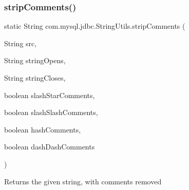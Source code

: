\subsubsection{\texorpdfstring{strip\+Comments()}{stripComments()}}
{\footnotesize\ttfamily static String com.\+mysql.\+jdbc.\+String\+Utils.\+strip\+Comments (\begin{DoxyParamCaption}\item[{String}]{src,  }\item[{String}]{string\+Opens,  }\item[{String}]{string\+Closes,  }\item[{boolean}]{slash\+Star\+Comments,  }\item[{boolean}]{slash\+Slash\+Comments,  }\item[{boolean}]{hash\+Comments,  }\item[{boolean}]{dash\+Dash\+Comments }\end{DoxyParamCaption})\hspace{0.3cm}{\ttfamily [static]}}

Returns the given string, with comments removed


